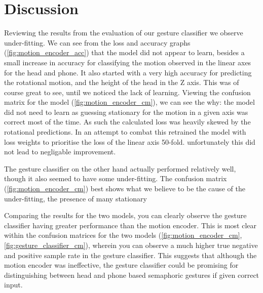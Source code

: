 \section{Discussion} %
Reviewing the results from the evaluation of our gesture classifier we observe under-fitting.
We can see from the loss and accuracy graphs (\autoref{fig:motion_encoder_acc}) that the model did not appear to learn, besides a small increase in accuracy for classifying the motion observed in the linear axes for the head and phone.
It also started with a very high accuracy for predicting the rotational motion, and the height of the head in the Z axis.
This was of course great to see, until we noticed the lack of learning. Viewing the confusion matrix for the model (\autoref{fig:motion_encoder_cm}), we can see the why: the model did not need to learn as guessing stationary for the motion in a given axis was correct most of the time.
As such the calculated loss was heavily skewed by the rotational predictions. In an attempt to combat this retrained the model with loss weights to prioritise the loss of the linear axis 50-fold. unfortunately this did not lead to negligable improvement.

The gesture classifier on the other hand actually performed relatively well, though it also seemed to have some under-fitting.
The confusion matrix (\autoref{fig:motion_encoder_cm}) best shows what we believe to be the cause of the under-fitting, the presence of many stationary 




Comparing the results for the two models, you can clearly observe the gesture classifier having greater performance than the motion encoder.
This is most clear within the confusion matrices for the two models (\autoref{fig:motion_encoder_cm}, \autoref{fig:gesture_classifier_cm}), wherein you can observe a much higher true negative and positive sample rate in the gesture classifier.
This suggests that although the motion encoder was ineffective, the gesture classifier could be promising for distinguishing between head and phone based semaphoric gestures if given correct input.

